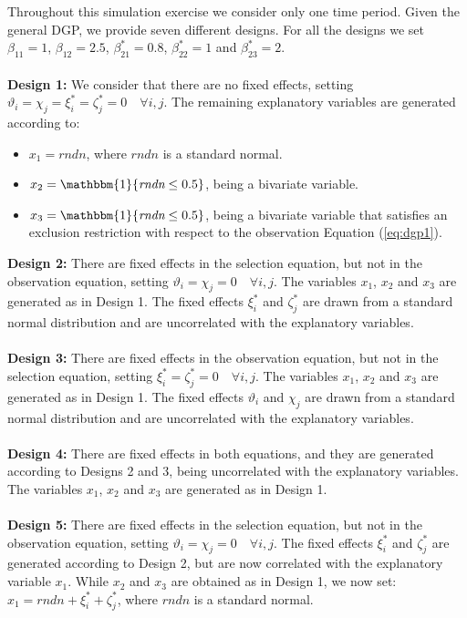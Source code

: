 Throughout this simulation exercise we consider only one time period. Given the general DGP, we provide seven different designs. For all the designs we set $\beta_{11} = 1$, $\beta_{12} = 2.5$, $\beta_{21}^* = 0.8$, $\beta_{22}^* = 1$ and $\beta_{23}^* = 2$.\\
\\
\textbf{Design 1:} We consider that there are no fixed effects, setting $\vartheta_i = \chi_j = \xi_{i}^* = \zeta_{j}^* = 0 \quad \forall i,j$. The remaining explanatory variables are generated according to:
\begin{itemize}
  \item $x_1 = \textit{rndn}$, where $\textit{rndn}$ is a standard normal.
  \item $x_2 = \mathbbm{1}\{\textit{rndn} \leq 0.5\}$, being a bivariate variable.
  \item $x_3 = \mathbbm{1}\{\textit{rndn} \leq 0.5\}$, being a bivariate variable that satisfies an exclusion restriction with respect to the observation Equation (\ref{eq:dgp1}).
\end{itemize}
\textbf{Design 2:} There are fixed effects in the selection equation, but not in the observation equation, setting $\vartheta_i = \chi_j = 0 \quad \forall i,j$. The variables $x_1$, $x_2$ and $x_3$ are generated as in Design 1. The fixed effects $\xi_{i}^*$ and $\zeta_{j}^*$ are drawn from a standard normal distribution and are uncorrelated with the explanatory variables. \\
\\
\textbf{Design 3:} There are fixed effects in the observation equation, but not in the selection equation, setting $\xi_{i}^* = \zeta_{j}^* = 0 \quad \forall i,j$. The variables $x_1$, $x_2$ and $x_3$ are generated as in Design 1. The fixed effects $\vartheta_i$ and $\chi_j$ are drawn from a standard normal distribution and are uncorrelated with the explanatory variables. \\
\\
\textbf{Design 4:} There are fixed effects in both equations, and they are generated according to Designs 2 and 3, being uncorrelated with the explanatory variables. The variables $x_1$, $x_2$ and $x_3$ are generated as in Design 1. \\
\\
\textbf{Design 5:} There are fixed effects in the selection equation, but not in the observation equation, setting $\vartheta_i = \chi_j = 0 \quad \forall i,j$. The fixed effects $\xi_{i}^*$ and $\zeta_{j}^*$ are generated according to Design 2, but are now correlated with the explanatory variable $x_1$. While $x_2$ and $x_3$ are obtained as in Design 1, we now set: $x_1 = \textit{rndn} + \xi_{i}^* + \zeta_{j}^*$, where $\textit{rndn}$ is a standard normal. \\
